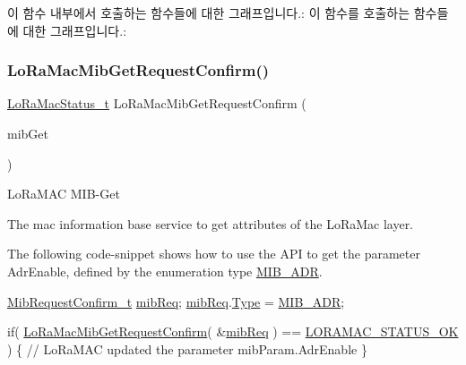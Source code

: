 이 함수 내부에서 호출하는 함수들에 대한 그래프입니다.\+:
이 함수를 호출하는 함수들에 대한 그래프입니다.\+:
\mbox{\label{group___l_o_r_a_m_a_c_ga3e208a4f73213aa801eeb9d9da7b71dd}} 
\subsubsection{\texorpdfstring{Lo\+Ra\+Mac\+Mib\+Get\+Request\+Confirm()}{LoRaMacMibGetRequestConfirm()}}
{\footnotesize\ttfamily \mbox{\hyperlink{group___l_o_r_a_m_a_c_ga30bd25657e10480f8605ee951b0ecfbd}{Lo\+Ra\+Mac\+Status\+\_\+t}} Lo\+Ra\+Mac\+Mib\+Get\+Request\+Confirm (\begin{DoxyParamCaption}\item[{\mbox{\hyperlink{group___l_o_r_a_m_a_c_ga9269d5ae88dd157a58e9d60f680d63f0}{Mib\+Request\+Confirm\+\_\+t}} $\ast$}]{mib\+Get }\end{DoxyParamCaption})}



Lo\+Ra\+M\+AC M\+I\+B-\/\+Get 

The mac information base service to get attributes of the Lo\+Ra\+Mac layer.

The following code-\/snippet shows how to use the A\+PI to get the parameter Adr\+Enable, defined by the enumeration type \mbox{\hyperlink{group___l_o_r_a_m_a_c_gga32ea83d13a3f5bb4b3ec2ace2319ab61a756ff0b66217e3e4ddd0442c8aa56802}{M\+I\+B\+\_\+\+A\+DR}}. 
\begin{DoxyCode}
\mbox{\hyperlink{structe_mib_request_confirm}{MibRequestConfirm\_t}} \mbox{\hyperlink{lora_8c_a553baee9b2c1a2c0aa6334bb5560f3d1}{mibReq}};
\mbox{\hyperlink{lora_8c_a553baee9b2c1a2c0aa6334bb5560f3d1}{mibReq}}.\mbox{\hyperlink{structe_mib_request_confirm_ada1f9249fb28125c69bdfacfaeeae0e2}{Type}} = \mbox{\hyperlink{group___l_o_r_a_m_a_c_gga32ea83d13a3f5bb4b3ec2ace2319ab61a756ff0b66217e3e4ddd0442c8aa56802}{MIB\_ADR}};

\textcolor{keywordflow}{if}( \mbox{\hyperlink{group___l_o_r_a_m_a_c_ga3e208a4f73213aa801eeb9d9da7b71dd}{LoRaMacMibGetRequestConfirm}}( &\mbox{\hyperlink{lora_8c_a553baee9b2c1a2c0aa6334bb5560f3d1}{mibReq}} ) == 
      \mbox{\hyperlink{group___l_o_r_a_m_a_c_gga1d18f26b344040b3ec5c3db662919661a03db5fca052313edb3823c014b653a74}{LORAMAC\_STATUS\_OK}} )
\{
  \textcolor{comment}{// LoRaMAC updated the parameter mibParam.AdrEnable}
\}
\end{DoxyCode}



